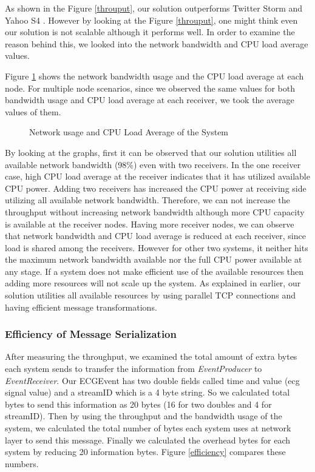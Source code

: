 As shown in the Figure \ref{throuput}, our solution outperforms Twitter Storm \cite{twitterStorm} and Yahoo S4 \cite{neumeyer2010s4}. However by looking at the Figure \ref{throuput}, one might think even our solution is not scalable although it performs well. In order to examine the reason behind this, we looked into the network bandwidth and CPU load average values. 
 
Figure \ref{networkandload} shows the network bandwidth usage and the CPU load average at each node. For multiple node scenarios, since we observed the same values for both bandwidth usage and CPU load average at each receiver, we took the average values of them. 

\begin{figure}[!t]
	\centering
	\hfil
	\caption{Network usage and CPU Load Average of the System}
	\label{networkandload}
\end{figure}
 

By looking at the graphs, first it can be observed that our solution utilities all available network bandwidth (98\%) even with two receivers. In the one receiver case, high CPU load average at the receiver indicates that it has utilized available CPU power. Adding two receivers has increased the CPU power at receiving side utilizing all available network bandwidth. Therefore, we can not increase the throughput without increasing network bandwidth although more CPU capacity is available at the receiver nodes. Having more receiver nodes, we can observe that network bandwidth and CPU load average is reduced at each receiver, since load is shared among the receivers. However for other two systems, it neither hits the maximum network bandwidth available nor the full CPU power available at any stage. If a system does not make efficient use of the available resources then adding more resources will not scale up the system. As explained in earlier, our solution utilities all available resources by using parallel TCP connections and having efficient message transformations.

\subsubsection{Efficiency of Message Serialization}
After measuring the throughput, we examined the  total amount of extra bytes each system sends to transfer the information from \textit{EventProducer} to \textit{EventReceiver}. Our ECGEvent has two double fields called time and value (ecg signal value) and a streamID which is a 4 byte string. So we calculated total bytes to send this information as 20 bytes (16 for two doubles and 4 for streamID). Then by using the throughput and the bandwidth usage of the system, we calculated the total number of bytes each system uses at network layer to send this message. Finally we calculated the overhead bytes for each system by reducing 20 information bytes. Figure \ref{efficiency} compares these numbers.

